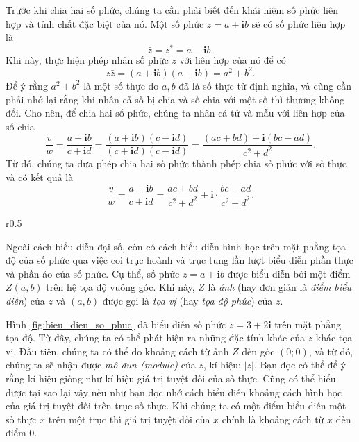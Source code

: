 \documentclass[a4paper, titlepage, openany]{book}
\begin{document}
Trước khi chia hai số phức, chúng ta cần phải biết đến khái niệm số phức liên hợp và tính chất đặc biệt của nó. Một số phức $z = a+\mathbf{i}b$ sẽ có số phức liên hợp là $$\bar{z} = z^* = a - \mathbf{i}b.$$ Khi này, thực hiện phép nhân số phức $z$ với liên hợp của nó để có $$z\bar{z} = (a+\mathbf{i}b)(a-\mathbf{i}b) = a^2 + b^2.$$ Để ý rằng $a^2 + b^2$ là một số thực do $a, b$ đã là số thực từ định nghĩa, và cũng cần phải nhớ lại rằng khi nhân cả số bị chia và số chia với một số thì thương không đổi. Cho nên, để chia hai số phức, chúng ta nhân cả tử và mẫu với liên hợp của số chia $$\frac{v}{w} = \frac{a + \mathbf{i}b}{c + \mathbf{i}d} = \frac{\left(a + \mathbf{i}b\right)\left(c - \mathbf{i}d\right)}{\left(c + \mathbf{i}d\right)\left(c - \mathbf{i}d\right)} = \frac{\left(ac+bd\right) + \mathbf{i}\left(bc - ad\right)}{c^2+d^2}.$$ Từ đó, chúng ta đưa phép chia hai số phức thành phép chia số phức với số thực và có kết quả là $$\frac{v}{w} = \frac{a + \mathbf{i}b}{c + \mathbf{i}d} = \frac{ac+bd}{c^2+d^2}+\mathbf{i}\cdot\frac{bc - ad}{c^2+d^2}.$$

\begin{wrapfigure}{r}{0.5\textwidth}
    \centering

   \caption{Biểu diễn $z = 3 + 2\mathbf{i}$ trên mặt phẳng tọa độ}
   \label{fig:bieu_dien_so_phuc}
\end{wrapfigure}

Ngoài cách biểu diễn đại số, còn có cách biểu diễn hình học trên mặt phẳng tọa độ của số phức qua việc coi trục hoành và trục tung lần lượt biểu diễn phần thực và phần ảo của số phức. Cụ thể, số phức $z = a + \mathbf{i}b$ được biểu diễn bởi một điểm $Z(a,b)$ trên hệ tọa độ vuông góc. Khi này, $Z$ là \emph{ảnh} (hay đơn giản là \emph{điểm biểu diễn}) của $z$ và $(a,b)$ được gọi là \emph{tọa vị} (hay \emph{tọa độ phức}) của $z$.

Hình \ref{fig:bieu_dien_so_phuc} đã biểu diễn số phức $z = 3 + 2\mathbf{i}$ trên mặt phẳng tọa độ. Từ đây, chúng ta có thể phát hiện ra những đặc tính khác của $z$ khác tọa vị. Đầu tiên, chúng ta có thể đo khoảng cách từ ảnh $Z$ đến gốc $(0;0)$, và từ đó, chúng ta sẽ nhận được \emph{mô-đun (module)} của $z$, kí hiệu: $|z|$. Bạn đọc có thể để ý rằng kí hiệu giống như kí hiệu giá trị tuyệt đối của số thực. Cũng có thể hiểu được tại sao lại vậy nếu như bạn đọc nhớ cách biểu diễn khoảng cách hình học của giá trị tuyệt đối trên trục số thực. Khi chúng ta có một điểm biểu diễn một số thực $x$ trên một trục thì giá trị tuyệt đối của $x$ chính là khoảng cách từ $x$ đến điểm $0$.
\end{document}
